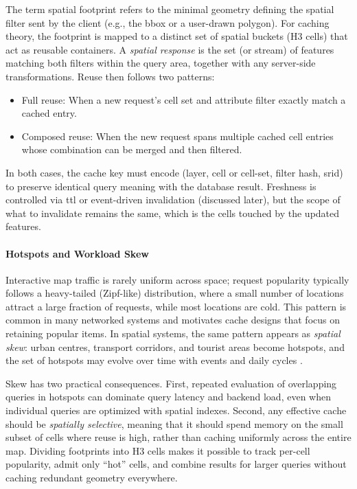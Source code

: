 The term spatial footprint refers to the minimal geometry defining the spatial filter sent by the client (e.g., the \ac{bbox} or a user-drawn polygon). For caching theory, the footprint is mapped to a distinct set of spatial buckets (H3 cells) that act as reusable containers. A \emph{spatial response} is the set (or stream) of features matching both filters within the query area, together with any server-side transformations. Reuse then follows two patterns:
\begin{itemize}
  \item Full reuse: When a new request's cell set and attribute filter exactly match a cached entry.
  \item Composed reuse: When the new request spans multiple cached cell entries whose combination can be merged and then filtered.
\end{itemize}

In both cases, the cache key must encode (layer, cell or cell-set, filter hash, \ac{srid}) to preserve identical query meaning with the database result. Freshness is controlled via \ac{ttl} or event-driven invalidation (discussed later), but the scope of what to invalidate remains the same, which is the cells touched by the updated features.

\paragraph{Hotspots and Workload Skew}
Interactive map traffic is rarely uniform across space; request popularity typically follows a heavy-tailed (Zipf-like) distribution, where a small number of locations attract a large fraction of requests, while most locations are cold. This pattern is common in many networked systems and motivates cache designs that focus on retaining popular items. In spatial systems, the same pattern appears as \emph{spatial skew}: urban centres, transport corridors, and tourist areas become hotspots, and the set of hotspots may evolve over time with events and daily cycles \cite{Pan_2017}.

Skew has two practical consequences. First, repeated evaluation of overlapping queries in hotspots can dominate query latency and backend load, even when individual queries are optimized with spatial indexes. Second, any effective cache should be \emph{spatially selective}, meaning that it should spend memory on the small subset of cells where reuse is high, rather than caching uniformly across the entire map. Dividing footprints into H3 cells makes it possible to track per-cell popularity, admit only “hot” cells, and combine results for larger queries without caching redundant geometry everywhere.

